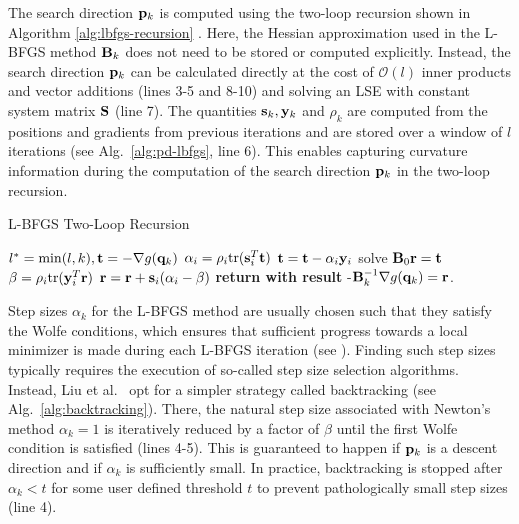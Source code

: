 The search direction $\mathbf{p}_k$ is computed using the two-loop recursion shown in Algorithm \ref{alg:lbfgs-recursion} \cite{nocedal2006, liu2017}.
Here, the Hessian approximation used in the L-BFGS method $\mathbf{B}_k$ does not need to be stored or computed explicitly. Instead, the 
search direction $\mathbf{p}_k$ can be calculated directly at the cost of $\mathcal{O}(l)$ inner products and vector additions (lines 3-5 and 8-10) 
and solving an LSE with constant system matrix $\mathbf{S}$ (line 7). The quantities $\mathbf{s}_k, \mathbf{y}_k$ and $\rho_k$ are computed from the 
positions and gradients from previous iterations and are stored over a window of $l$ iterations (see Alg.\ \ref{alg:pd-lbfgs}, line 6). This 
enables capturing curvature information during the computation of the search direction $\mathbf{p}_k$ in the two-loop recursion. 

\begin{algorithm}[tb]
\caption{L-BFGS Two-Loop Recursion}\label{alg:lbfgs-recursion}
\begin{algorithmic}[1]
\State $l^* = \min(l, k), \mathbf{t} = -\nabla g(\mathbf{q}_k)$
\State $\alpha_i = \rho_i \text{tr}(\mathbf{s}^T_i \mathbf{t})$
\State $\mathbf{t} = \mathbf{t} - \alpha_i \mathbf{y}_i$
\EndFor
\State solve $\mathbf{B}_0 \mathbf{r} = \mathbf{t}$
\State $\beta = \rho_i \text{tr}(\mathbf{y}^T_i \mathbf{r})$
\State $\mathbf{r} = \mathbf{r} + \mathbf{s}_i(\alpha_i - \beta)$
\EndFor
\State \textbf{return with result } -$\mathbf{B}^{-1}_k \nabla g(\mathbf{q}_k) = \mathbf{r}$.
\EndProcedure
\end{algorithmic}
\end{algorithm}

Step sizes $\alpha_k$ for the L-BFGS method are usually chosen such that they satisfy the Wolfe conditions, which ensures that sufficient progress 
towards a local minimizer is made during each L-BFGS iteration (see \cite{nocedal2006}). Finding such step sizes typically requires the execution of 
so-called step size selection algorithms. Instead, Liu et al.\ \cite{liu2017} opt for a simpler strategy called backtracking (see Alg.\ 
\ref{alg:backtracking}). There, the natural step size associated with Newton's method $\alpha_k = 1$ is iteratively reduced by a factor of $\beta$ 
until the first Wolfe condition is satisfied (lines 4-5). This is guaranteed to happen if $\mathbf{p}_k$ is a descent 
direction and if $\alpha_k$ is sufficiently small. In practice, backtracking is stopped after $\alpha_k < t$ for some user defined threshold $t$ to 
prevent pathologically small step sizes (line 4).

